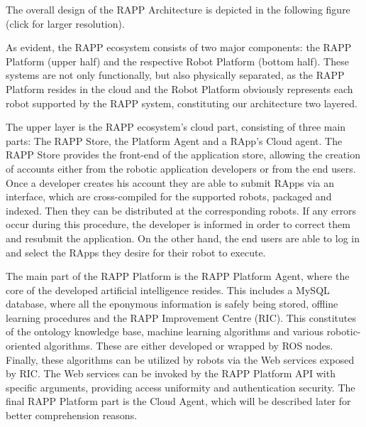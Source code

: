 The overall design of the R\-A\-P\-P Architecture is depicted in the following figure (click for larger resolution).

\href{https://raw.githubusercontent.com/wiki/rapp-project/rapp-platform/images/rapp_platform_architecture.png}{\tt }

As evident, the R\-A\-P\-P ecosystem consists of two major components\-: the R\-A\-P\-P Platform (upper half) and the respective Robot Platform (bottom half). These systems are not only functionally, but also physically separated, as the R\-A\-P\-P Platform resides in the cloud and the Robot Platform obviously represents each robot supported by the R\-A\-P\-P system, constituting our architecture two layered.

The upper layer is the R\-A\-P\-P ecosystem’s cloud part, consisting of three main parts\-: The R\-A\-P\-P Store, the Platform Agent and a R\-App’s Cloud agent. The R\-A\-P\-P Store provides the front-\/end of the application store, allowing the creation of accounts either from the robotic application developers or from the end users. Once a developer creates his account they are able to submit R\-Apps via an interface, which are cross-\/compiled for the supported robots, packaged and indexed. Then they can be distributed at the corresponding robots. If any errors occur during this procedure, the developer is informed in order to correct them and resubmit the application. On the other hand, the end users are able to log in and select the R\-Apps they desire for their robot to execute.

The main part of the R\-A\-P\-P Platform is the R\-A\-P\-P Platform Agent, where the core of the developed artificial intelligence resides. This includes a My\-S\-Q\-L database, where all the eponymous information is safely being stored, offline learning procedures and the R\-A\-P\-P Improvement Centre (R\-I\-C). This constitutes of the ontology knowledge base, machine learning algorithms and various robotic-\/oriented algorithms. These are either developed or wrapped by R\-O\-S nodes. Finally, these algorithms can be utilized by robots via the Web services exposed by R\-I\-C. The Web services can be invoked by the R\-A\-P\-P Platform A\-P\-I with specific arguments, providing access uniformity and authentication security. The final R\-A\-P\-P Platform part is the Cloud Agent, which will be described later for better comprehension reasons.

